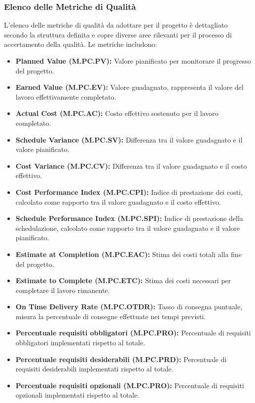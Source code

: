 \subsubsection{Elenco delle Metriche di Qualità} 
L'elenco delle metriche di qualità da adottare per il progetto è dettagliato secondo la struttura definita e copre diverse aree rilevanti per il processo di accertamento della qualità. Le metriche includono:
\begin{itemize}
    \item \textbf{Planned Value (M.PC.PV):} Valore pianificato per monitorare il progresso del progetto.
    \item \textbf{Earned Value (M.PC.EV):} Valore guadagnato, rappresenta il valore del lavoro effettivamente completato.
    \item \textbf{Actual Cost (M.PC.AC):} Costo effettivo sostenuto per il lavoro completato.
    \item \textbf{Schedule Variance (M.PC.SV):} Differenza tra il valore guadagnato e il valore pianificato.
    \item \textbf{Cost Variance (M.PC.CV):} Differenza tra il valore guadagnato e il costo effettivo.
    \item \textbf{Cost Performance Index (M.PC.CPI):} Indice di prestazione dei costi, calcolato come rapporto tra il valore guadagnato e il costo effettivo.
    \item \textbf{Schedule Performance Index (M.PC.SPI):} Indice di prestazione della schedulazione, calcolato come rapporto tra il valore guadagnato e il valore pianificato.
    \item \textbf{Estimate at Completion (M.PC.EAC):} Stima dei costi totali alla fine del progetto.
    \item \textbf{Estimate to Complete (M.PC.ETC):} Stima dei costi necessari per completare il lavoro rimanente.
    \item \textbf{On Time Delivery Rate (M.PC.OTDR):} Tasso di consegna puntuale, misura la percentuale di consegne effettuate nei tempi previsti.
    \item \textbf{Percentuale requisiti obbligatori (M.PC.PRO):} Percentuale di requisiti obbligatori implementati rispetto al totale.
    \item \textbf{Percentuale requisiti desiderabili (M.PC.PRD):} Percentuale di requisiti desiderabili implementati rispetto al totale.
    \item \textbf{Percentuale requisiti opzionali (M.PC.PRO):} Percentuale di requisiti opzionali implementati rispetto al totale.

\end{itemize}

